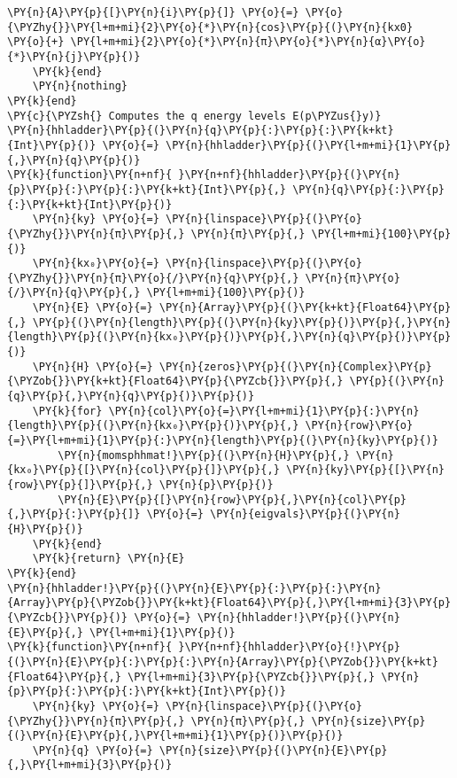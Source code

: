 \begin{Verbatim}[commandchars=\\\{\}]
        \PY{n}{A}\PY{p}{[}\PY{n}{i}\PY{p}{]} \PY{o}{=} \PY{o}{\PYZhy{}}\PY{l+m+mi}{2}\PY{o}{*}\PY{n}{cos}\PY{p}{(}\PY{n}{kx0} \PY{o}{+} \PY{l+m+mi}{2}\PY{o}{*}\PY{n}{π}\PY{o}{*}\PY{n}{α}\PY{o}{*}\PY{n}{j}\PY{p}{)}
    \PY{k}{end}
    \PY{n}{nothing}
\PY{k}{end}
\PY{c}{\PYZsh{} Computes the q energy levels E(p\PYZus{}y)}
\PY{n}{hhladder}\PY{p}{(}\PY{n}{q}\PY{p}{:}\PY{p}{:}\PY{k+kt}{Int}\PY{p}{)} \PY{o}{=} \PY{n}{hhladder}\PY{p}{(}\PY{l+m+mi}{1}\PY{p}{,}\PY{n}{q}\PY{p}{)}
\PY{k}{function}\PY{n+nf}{ }\PY{n+nf}{hhladder}\PY{p}{(}\PY{n}{p}\PY{p}{:}\PY{p}{:}\PY{k+kt}{Int}\PY{p}{,} \PY{n}{q}\PY{p}{:}\PY{p}{:}\PY{k+kt}{Int}\PY{p}{)}
    \PY{n}{ky} \PY{o}{=} \PY{n}{linspace}\PY{p}{(}\PY{o}{\PYZhy{}}\PY{n}{π}\PY{p}{,} \PY{n}{π}\PY{p}{,} \PY{l+m+mi}{100}\PY{p}{)}
    \PY{n}{kx₀}\PY{o}{=} \PY{n}{linspace}\PY{p}{(}\PY{o}{\PYZhy{}}\PY{n}{π}\PY{o}{/}\PY{n}{q}\PY{p}{,} \PY{n}{π}\PY{o}{/}\PY{n}{q}\PY{p}{,} \PY{l+m+mi}{100}\PY{p}{)}
    \PY{n}{E} \PY{o}{=} \PY{n}{Array}\PY{p}{(}\PY{k+kt}{Float64}\PY{p}{,} \PY{p}{(}\PY{n}{length}\PY{p}{(}\PY{n}{ky}\PY{p}{)}\PY{p}{,}\PY{n}{length}\PY{p}{(}\PY{n}{kx₀}\PY{p}{)}\PY{p}{,}\PY{n}{q}\PY{p}{)}\PY{p}{)}
    \PY{n}{H} \PY{o}{=} \PY{n}{zeros}\PY{p}{(}\PY{n}{Complex}\PY{p}{\PYZob{}}\PY{k+kt}{Float64}\PY{p}{\PYZcb{}}\PY{p}{,} \PY{p}{(}\PY{n}{q}\PY{p}{,}\PY{n}{q}\PY{p}{)}\PY{p}{)}
    \PY{k}{for} \PY{n}{col}\PY{o}{=}\PY{l+m+mi}{1}\PY{p}{:}\PY{n}{length}\PY{p}{(}\PY{n}{kx₀}\PY{p}{)}\PY{p}{,} \PY{n}{row}\PY{o}{=}\PY{l+m+mi}{1}\PY{p}{:}\PY{n}{length}\PY{p}{(}\PY{n}{ky}\PY{p}{)}
        \PY{n}{momsphhmat!}\PY{p}{(}\PY{n}{H}\PY{p}{,} \PY{n}{kx₀}\PY{p}{[}\PY{n}{col}\PY{p}{]}\PY{p}{,} \PY{n}{ky}\PY{p}{[}\PY{n}{row}\PY{p}{]}\PY{p}{,} \PY{n}{p}\PY{p}{)}
        \PY{n}{E}\PY{p}{[}\PY{n}{row}\PY{p}{,}\PY{n}{col}\PY{p}{,}\PY{p}{:}\PY{p}{]} \PY{o}{=} \PY{n}{eigvals}\PY{p}{(}\PY{n}{H}\PY{p}{)}
    \PY{k}{end}
    \PY{k}{return} \PY{n}{E}
\PY{k}{end}
\PY{n}{hhladder!}\PY{p}{(}\PY{n}{E}\PY{p}{:}\PY{p}{:}\PY{n}{Array}\PY{p}{\PYZob{}}\PY{k+kt}{Float64}\PY{p}{,}\PY{l+m+mi}{3}\PY{p}{\PYZcb{}}\PY{p}{)} \PY{o}{=} \PY{n}{hhladder!}\PY{p}{(}\PY{n}{E}\PY{p}{,} \PY{l+m+mi}{1}\PY{p}{)}
\PY{k}{function}\PY{n+nf}{ }\PY{n+nf}{hhladder}\PY{o}{!}\PY{p}{(}\PY{n}{E}\PY{p}{:}\PY{p}{:}\PY{n}{Array}\PY{p}{\PYZob{}}\PY{k+kt}{Float64}\PY{p}{,} \PY{l+m+mi}{3}\PY{p}{\PYZcb{}}\PY{p}{,} \PY{n}{p}\PY{p}{:}\PY{p}{:}\PY{k+kt}{Int}\PY{p}{)}
    \PY{n}{ky} \PY{o}{=} \PY{n}{linspace}\PY{p}{(}\PY{o}{\PYZhy{}}\PY{n}{π}\PY{p}{,} \PY{n}{π}\PY{p}{,} \PY{n}{size}\PY{p}{(}\PY{n}{E}\PY{p}{,}\PY{l+m+mi}{1}\PY{p}{)}\PY{p}{)}
    \PY{n}{q} \PY{o}{=} \PY{n}{size}\PY{p}{(}\PY{n}{E}\PY{p}{,}\PY{l+m+mi}{3}\PY{p}{)}

\end{Verbatim}
